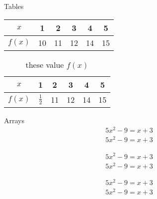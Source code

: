 \documentclass[]{article}
\begin{document}
Tables \\[6pt]

\begin{tabular}{|c|c|c|c|c|c|}
    \hline

    $ x $ & 1 & 2 & 3 & 4 & 5 \\ \hline
    $ f(x) $ & 10 & 11 & 12 & 14 & 15  \\ \hline


\end{tabular}

\vspace{2cm}

\begin{table}[H]
    
    \centering
    \def\arraystretch{1.5}

\begin{tabular}{|c|c|c|c|c|c|}
    \hline

    $ x $ & 1 & 2 & 3 & 4 & 5 \\ \hline
    $ f(x) $ & $ \frac{1}{2} $ & 11 & 12 & 14 & 15  \\ \hline


\end{tabular}

\caption{these value $ f(x) $}

\end{table}

Arrays \\[6pt]

\begin{align}
5x^2-9=x+3 \\
5x^2-9=x+3 
\end{align}

\begin{align*}
    5x^2-9=x+3 \\
    5x^2-9=x+3 
    \end{align*}

    \begin{align}
        5x^2-9=x+3 \\
        5x^2-9=x+3 
        \end{align}
\end{document}
